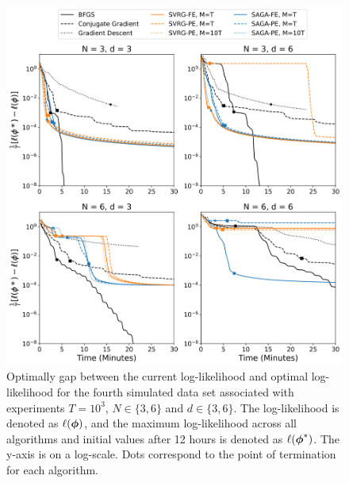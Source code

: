 \documentclass[12pt]{article}
\begin{document}
\begin{figure}[H]
    \centering
    \includegraphics[width=6.5in]{../plt/log-like_v_time_T-1000-003.png}
    \caption{Optimally gap between the current log-likelihood and optimal log-likelihood for the fourth simulated data set associated with experiments $T=10^{3}$, $N \in \{3,6\}$ and $d \in \{3,6\}$. The log-likelihood is denoted as $\ell(\boldsymbol{\phi})$, and the maximum log-likelihood across all algorithms and initial values after 12 hours is denoted as $\ell(\boldsymbol{\phi}^*)$. The y-axis is on a log-scale. Dots correspond to the point of termination for each algorithm.}
\end{figure}
%
\end{document}
